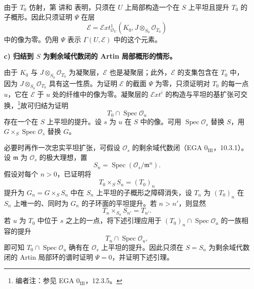 由于 \(T_0\) 仿射，第  讲和  表明，只须在 \(U\) 上局部构造一个在 \(S\) 上平坦且提升 \(T_0\) 的子概形。因此只须证明 \(\Psi\) 在层
\[
  \mathscr E=
  \mathcal Ext^{1}_{\mathcal O_U}
  (K_0,J\otimes_{S_0}\mathcal O_{T_0})
\]
中的像为零。仍用 \(\Psi\) 表示 \(\Gamma(U,\mathscr E)\) 中的这个元素。

\medskip\noindent\textbf{c) 归结到 \(S\) 为剩余域代数闭的 Artin 局部概形的情形。}

由于 \(K_0\) 与 \(J\otimes_{S_0}\mathcal O_{T_0}\) 为凝聚层，\(\mathscr E\) 也是凝聚层；此外，\(\mathscr E\) 的支集包含在 \(T_0\) 中，因为 \(J\otimes_{S_0}\mathcal O_{T_0}\) 具有这一性质。为证明 \(\mathscr E\) 的截面 \(\Psi\) 为零，只须证明对 \(T_0\) 的每一点 \(u\)，它在 \(\mathscr E\) 于 \(u\) 处的纤维中的像为零。凝聚层的 \(\mathcal Ext^i\) 的构造与平坦的基扩张可交换，\footnote{编者注：参见 EGA \(0_{\mathrm{III}}\)，12.3.5。}故可归结为证明
\[
  T_0\cap\operatorname{Spec}\mathcal O_u
\]
存在一个在 \(S\) 上平坦的提升。设 \(s\) 为 \(u\) 在 \(S\) 中的像。可用 \(\operatorname{Spec}\mathcal O_s\) 替换 \(S\)，用 \(G\times_S\operatorname{Spec}\mathcal O_s\) 替换 \(G\)。

必要时再作一次忠实平坦扩张，可假设 \(\mathcal O_s\) 的剩余域代数闭（EGA \(0_{\mathrm{III}}\)，10.3.1）。设 \(\mathfrak m\) 为 \(\mathcal O_s\) 的极大理想，置
\[
  S_n=\operatorname{Spec}(\mathcal O_s/\mathfrak m^n).
\]
假设对每个 \(n>0\)，已证明将
\[
  T_0\times_S S_n=(T_0)_n
\]
提升为 \(G_n=G\times_S S_n\) 中在 \(S_n\) 上平坦的子概形之障碍消失，设 \(T_n\) 为 \((T_0)_n\) 在 \(S_n\) 上唯一的、同时为 \(G_n\) 的子环面的平坦提升。若 \(n>n'\)，则显然
\[
  T_n\times_{S_n}S_{n'}=T_{n'}.
\]
若 \(u\) 为 \(T_0\) 中位于 \(s\) 之上的一点，将下述引理应用于 \((T_0)_n\cap\operatorname{Spec}\mathcal O_u\) 的一族相容的提升
\[
  T_n\cap\operatorname{Spec}\mathcal O_u,
\]
即可知 \(T_0\cap\operatorname{Spec}\mathcal O_u\) 确有在 \(\mathcal O_s\) 上平坦的提升。因此只须在 \(S=S_n\) 为剩余域代数闭的 Artin 局部环的谱时证明 \(\Psi=0\)，并证明下述引理。


